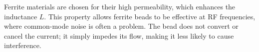 Ferrite materials are chosen for their high permeability, which enhances the inductance \( L \). This property allows ferrite beads to be effective at RF frequencies, where common-mode noise is often a problem. The bead does not convert or cancel the current; it simply impedes its flow, making it less likely to cause interference.

